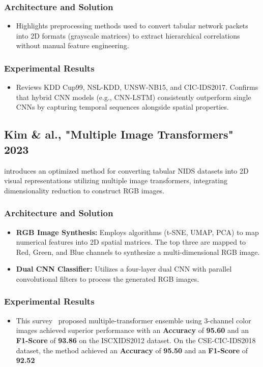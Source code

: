 \documentclass[12pt, a4paper]{report}
\begin{document}
\subsubsection{Architecture and Solution}
\begin{itemize}
    \item Highlights preprocessing methods used to convert tabular network packets into 2D formats (grayscale matrices) to extract hierarchical correlations without manual feature engineering.
\end{itemize}

\subsubsection{Experimental Results}
\begin{itemize}
    \item Reviews KDD Cup99, NSL-KDD, UNSW-NB15, and CIC-IDS2017. Confirms that hybrid CNN models (e.g., CNN-LSTM) consistently outperform single CNNs by capturing temporal sequences alongside spatial properties. 
\end{itemize}

\subsection{Kim \& al., "Multiple Image Transformers" 2023}
\cite{kim2023deep} introduces an optimized method for converting tabular NIDS datasets into 2D visual representations utilizing multiple image transformers, integrating dimensionality reduction to construct RGB images.

\subsubsection{Architecture and Solution}
\begin{itemize}
    \item \textbf{RGB Image Synthesis:} Employs algorithms (t-SNE, UMAP, PCA) to map numerical features into 2D spatial matrices. The top three are mapped to Red, Green, and Blue channels to synthesize a multi-dimensional RGB image.
    \item \textbf{Dual CNN Classifier:} Utilizes a four-layer dual CNN with parallel convolutional filters to process the generated RGB images.
\end{itemize}

\subsubsection{Experimental Results}
\begin{itemize}
    \item This survey \ proposed multiple-transformer ensemble using 3-channel color images achieved superior performance with an \textbf{Accuracy} of \textbf{95.60} and an \textbf{F1-Score} of \textbf{93.86} on the ISCXIDS2012 dataset. On the CSE-CIC-IDS2018 dataset, the method achieved an \textbf{Accuracy} of \textbf{95.50} and an \textbf{F1-Score} of \textbf{92.52} 
\end{itemize}
\end{document}

